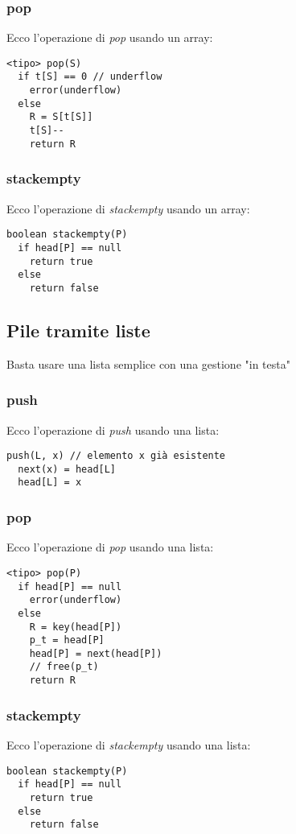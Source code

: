 \documentclass[a4paper,12pt,oneside,tikz]{book}
\begin{document}
\subsubsection{pop}
Ecco l'operazione di \textit{pop} usando un array:
\begin{verbatim}
<tipo> pop(S)
  if t[S] == 0 // underflow
    error(underflow)
  else
    R = S[t[S]]
    t[S]--
    return R
\end{verbatim}
\subsubsection{stackempty}
Ecco l'operazione di \textit{stackempty} usando un array:
\begin{verbatim}
boolean stackempty(P)
  if head[P] == null
    return true
  else
    return false
\end{verbatim}
\subsection{Pile tramite liste}
Basta usare una lista semplice con una gestione "in testa"
\subsubsection{push}
Ecco l'operazione di \textit{push} usando una lista:
\begin{verbatim}
push(L, x) // elemento x già esistente
  next(x) = head[L]
  head[L] = x
\end{verbatim}
\newpage
\subsubsection{pop}
Ecco l'operazione di \textit{pop} usando una lista:
\begin{verbatim}
<tipo> pop(P)
  if head[P] == null
    error(underflow)
  else
    R = key(head[P])
    p_t = head[P]
    head[P] = next(head[P])
    // free(p_t)
    return R
\end{verbatim}
\subsubsection{stackempty}
Ecco l'operazione di \textit{stackempty} usando una lista:
\begin{verbatim}
boolean stackempty(P)
  if head[P] == null
    return true
  else
    return false
\end{verbatim}
\end{document}
